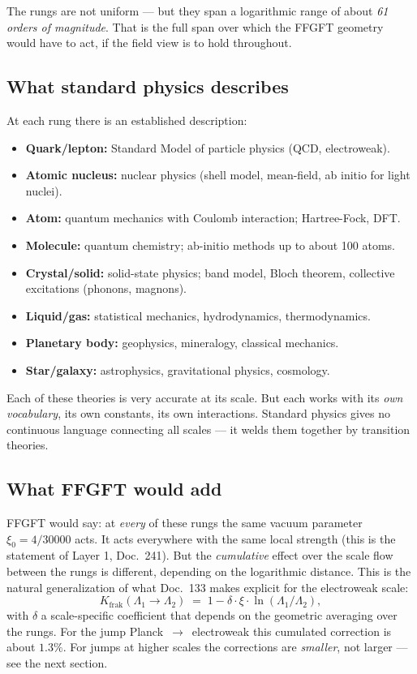 The rungs are not uniform --- but they span a logarithmic range of
about \emph{61 orders of magnitude}. That is the full span over
which the FFGFT geometry would have to act, if the field view is to
hold throughout.

\subsection*{What standard physics describes}

At each rung there is an established description:

\begin{itemize}\setlength\itemsep{2pt}
  \item \textbf{Quark/lepton:} Standard Model of particle physics
        (QCD, electroweak).
  \item \textbf{Atomic nucleus:} nuclear physics (shell model,
        mean-field, ab initio for light nuclei).
  \item \textbf{Atom:} quantum mechanics with Coulomb interaction;
        Hartree-Fock, DFT.
  \item \textbf{Molecule:} quantum chemistry; ab-initio methods up to
        about 100 atoms.
  \item \textbf{Crystal/solid:} solid-state physics; band model,
        Bloch theorem, collective excitations (phonons, magnons).
  \item \textbf{Liquid/gas:} statistical mechanics, hydrodynamics,
        thermodynamics.
  \item \textbf{Planetary body:} geophysics, mineralogy, classical
        mechanics.
  \item \textbf{Star/galaxy:} astrophysics, gravitational physics,
        cosmology.
\end{itemize}

Each of these theories is very accurate at its scale. But each works
with its \emph{own vocabulary}, its own constants, its own
interactions. Standard physics gives no continuous language
connecting all scales --- it welds them together by transition
theories.

\subsection*{What FFGFT would add}

FFGFT would say: at \emph{every} of these rungs the same vacuum
parameter $\xi_{0} = 4/30000$ acts. It acts everywhere with the same
local strength (this is the statement of Layer 1, Doc.~241). But the
\emph{cumulative} effect over the scale flow between the rungs is
different, depending on the logarithmic distance. This is the natural
generalization of what Doc.~133 makes explicit for the electroweak
scale:
\[
  K_{\mathrm{frak}}(\Lambda_1 \to \Lambda_2) \;=\; 1 - \delta\!\cdot\!\xi\cdot\ln(\Lambda_1/\Lambda_2),
\]
with $\delta$ a scale-specific coefficient that depends on the
geometric averaging over the rungs. For the jump
Planck~$\to$~electroweak this cumulated correction is about
$1{.}3\%$. For jumps at higher scales the corrections are
\emph{smaller}, not larger --- see the next section.

